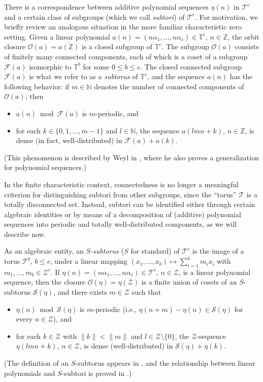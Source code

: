 \documentclass[11pt]{amsart}
\theoremstyle{theorem}
\theoremstyle{definition}
\newcommand{\N}{\mathbb{N}}
\newcommand{\Z}{\mathbb{Z}}
\newcommand{\T}{\mathbb{T}}
\newcommand{\mZ}{\mathcal{Z}}
\newcommand{\mT}{\mathcal{T}}
\newcommand{\mS}{\mathcal{S}}
\newcommand{\mF}{\mathcal{F}}
\newcommand{\mO}{\mathcal{O}}
\begin{document}
There is a correspondence between additive polynomial sequences $\eta(n)$ in $\mT^c$ and a certain class of subgroups (which we call \emph{subtori}) of $\mT^c$.
For motivation, we briefly review an analogous situation in the more familiar characteristic zero setting.
Given a linear polynomial $a(n) = (n\alpha_1, \ldots, n\alpha_c) \in \T^c$, $n \in \Z$, the orbit closure $\mO(a) = \overline{a(\Z)}$ is a closed subgroup of $\T^c$.
The subgroup $\mO(a)$ consists of finitely many connected components, each of which is a coset of a subgroup $\mF(a)$ isomorphic to $\T^b$ for some $0 \le b \le c$.
The closed connected subgroup $\mF(a)$ is what we refer to as a \emph{subtorus} of $\T^c$, and the sequence $a(n)$ has the following behavior: if $m \in \N$ denotes the number of connected components of $\mO(a)$, then
\begin{itemize}
	\item	$a(n) \bmod{\mF(a)}$ is $m$-periodic, and
	\item	for each $k \in \{0,1,\ldots,m-1\}$ and $l \in \N$, the sequence $a(lmn+k)$, $n \in \Z$, is dense (in fact, well-distributed) in $\mF(a) + a(k)$.
\end{itemize}
(This phenomenon is described by Weyl in \cite[Section 5]{weyl}, where he also proves a generalization for polynomial sequences.)

In the finite characteristic context, connectedness is no longer a meaningful criterion for distinguishing subtori from other subgroups, since the ``torus'' $\mT$ is a totally disconnected set.
Instead, subtori can be identified either through certain algebraic identities or by means of a decomposition of (additive) polynomial sequences into periodic and totally well-distributed components, as we will describe now.

As an algebraic entity, an \emph{$S$-subtorus} ($S$ for standard) of $\mT^c$ is the image of a torus $\mT^b$, $b \le c$, under a linear mapping $(x_1, \ldots, x_b) \mapsto \sum_{i=1}^b m_i x_i$ with $m_1, \ldots, m_b \in \mZ^c$.
If $\eta(n) = (n\alpha_1, \ldots, n\alpha_c) \in \mT^c$, $n \in \mZ$, is a linear polynomial sequence, then the closure $\mO(\eta) = \overline{\eta(\mZ)}$ is a finite union of cosets of an $S$-subtorus $\mS(\eta)$, and there exists $m \in \mZ$ such that
\begin{itemize}
	\item	$\eta(n) \bmod{\mS(\eta)}$ is $m$-periodic (i.e., $\eta(n+m) - \eta(n) \in \mS(\eta)$ for every $n \in \mZ$), and
	\item	for each $k \in \mZ$ with $\|k\| < \|m\|$ and $l \in \mZ \setminus \{0\}$, the $\mZ$-sequence $\eta(lmn+k)$, $n \in \mZ$, is dense (well-distributed) in $\mS(\eta) + \eta(k)$.
\end{itemize}
(The definition of an $S$-subtorus appears in \cite[Section 1]{bl}, and the relationship between linear polynomials and $S$-subtori is proved in \cite[Section 4]{bl}.)
\end{document}
